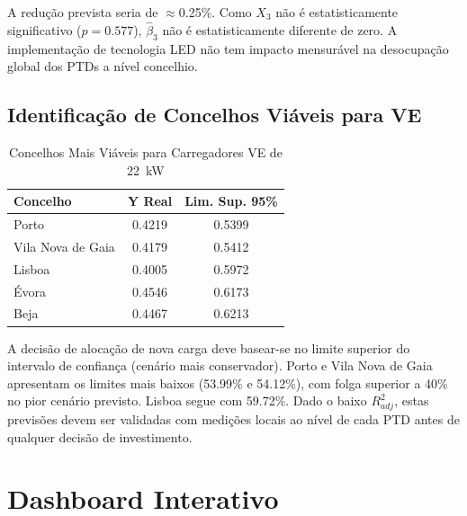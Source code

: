 \documentclass[conference]{IEEEtran}
\begin{document}
A redução prevista seria de $\approx$0.25\%. Como $X_3$ não é estatisticamente significativo ($p = 0.577$), $\hat{\beta}_3$ não é estatisticamente diferente de zero. A implementação de tecnologia LED não tem impacto mensurável na desocupação global dos PTDs a nível concelhio.

\subsection{Identificação de Concelhos Viáveis para VE}

\begin{table}[htbp]
\caption{Concelhos Mais Viáveis para Carregadores VE de 22~kW}
\label{tab:viabilidade}
\centering
\begin{tabular}{lcc}
\hline
\textbf{Concelho}  & \textbf{Y Real} & \textbf{Lim. Sup. 95\%} \\
\hline
Porto              & 0.4219 & 0.5399 \\
Vila Nova de Gaia  & 0.4179 & 0.5412 \\
Lisboa             & 0.4005 & 0.5972 \\
Évora              & 0.4546 & 0.6173 \\
Beja               & 0.4467 & 0.6213 \\
\hline
\end{tabular}
\end{table}

A decisão de alocação de nova carga deve basear-se no limite superior do intervalo de confiança (cenário mais conservador). Porto e Vila Nova de Gaia apresentam os limites mais baixos (53.99\% e 54.12\%), com folga superior a 40\% no pior cenário previsto. Lisboa segue com 59.72\%. Dado o baixo $R^2_{adj}$, estas previsões devem ser validadas com medições locais ao nível de cada PTD antes de qualquer decisão de investimento.

\section{Dashboard Interativo}
\end{document}

